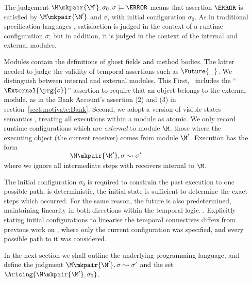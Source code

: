 The judgement $\M \mkpair  {\M'},\sigma_0 , \sigma \models \A$ means that  
assertion $\A$ is satisfied by  $\M \mkpair  {\M'}$ and $\sigma$, with initial configuration $\sigma_0$.  
As in traditional specification languages \cite{Leavens-etal07,Meyer92}, satisfaction is judged 
in the context of a runtime configuration $\sigma$; but in addition, it is judged in the context of the internal and external modules.


Modules contain the definitions of ghost fields and method bodies. The latter  needed to judge the validity of temporal assertions such as $\Future {\_}$. We distinguish between internal and external modules. This %
First, 
\Chainmail\ includes the ``$\External{\prg{o}}$'' assertion to require
that an object belongs to the external module, as in the Bank
Account's assertion (2) and (3) in
section~\ref{sect:motivate:Bank}. Second, we adopt a version of
visible states semantics \cite{MuellerPoetzsch-HeffterLeavens06,larch93,Meyer97}, treating all
executions within a module as atomic.
We only record runtime configurations which are {\em external}
 to module $\M$, \ie those where the
 executing object (\ie the current receiver) comes from module $\M'$.
 Execution %
 has the form\\
 $~ \strut  \hspace{1.3in}    \M \mkpair  {\M'},\sigma \leadsto \sigma'$\\  
where we ignore all intermediate steps
 with receivers  internal to $\M$. 
%

The initial configuration $\sigma_0$ is required to constrain the past execution to one possible path. 
is deterministic, the initial state is sufficient to determine the exact steps which occurred. For the same reason, the future is also predetermined, maintaining linearity in both directions within the temporal logic. 
. Explicitly stating initial configurations to linearise the temporal connectives differs from previous work on \Chainmail\cite{FASE}, where only the current configuration was specified, and every possible path to it was considered.

In the next section we  shall 
outline the underlying programming language, and
define the judgment  $\M \mkpair  {\M'},\sigma \leadsto \sigma'$ and the set 
$\Arising {\M \mkpair  {\M'}, \sigma_0}$.
 



